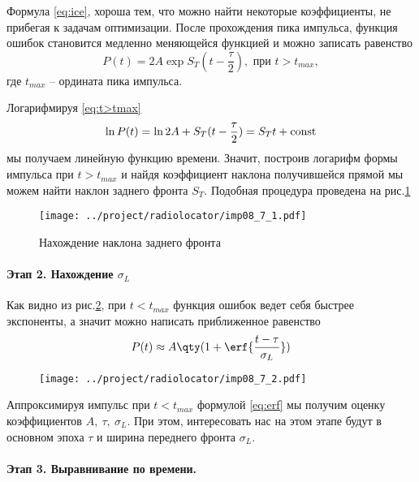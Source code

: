 Формула \eqref{eq:ice}, хороша тем, что можно найти некоторые коэффициенты, не
прибегая к задачам оптимизации. После прохождения пика импульса, функция ошибок
становится  медленно меняющейся функцией и можно записать равенство
\begin{equation}
    \label{eq:t>tmax}
    P(t) = 2A \exp{S_T (t - \frac{\tau}{2})}, \text{ при } t > t_{max},
\end{equation}
где $t_{max}$ -- ордината пика импульса.

Логарифмируя \eqref{eq:t>tmax}
\begin{equation}
    \ln P(t) = \ln 2A + S_T( t - \frac{\tau}{2}) = S_T t + \text{\rmfamily\upshape const} 
\end{equation}
мы получаем линейную функцию времени. Значит, построив логарифм формы импульса при
$t>t_{max}$ и найдя коэффициент наклона получившейся прямой мы можем найти
наклон заднего фронта $S_T$. Подобная процедура проведена на рис.\ref{fig:S_T}
 \begin{figure}[h]
    \centering
    \texttt{[image: ../project/radiolocator/imp08\_7\_1.pdf]}
    \caption{Нахождение наклона заднего фронта}
    \label{fig:S_T}
\end{figure}

\paragraph{Этап 2. Нахождение $\sigma_L$}%
Как видно из рис.\ref{fig:erf}, при $t<t_{max}$ функция ошибок ведет себя
быстрее экспоненты, а значит можно написать приближенное равенство
\begin{equation}
    \label{eq:erf}
    P(t) \approx A \qty(1 + \erf{\frac{t - \tau}{\sigma_L}})
\end{equation}

\begin{figure}[h]
    \centering
    \texttt{[image: ../project/radiolocator/imp08\_7\_2.pdf]}
    \label{fig:erf}
\end{figure}

Аппроксимируя импульс при $t<t_{max}$ формулой \eqref{eq:erf} мы получим оценку
коэффициентов $A,~\tau,~\sigma_L$. При этом, интересовать нас на этом этапе
будут в основном  эпоха $\tau$ и ширина переднего фронта  $\sigma_L$.

\paragraph{Этап 3. Выравнивание по времени.}%
\label{par:etap_3_vyravnivanie_po_vremeni_}

